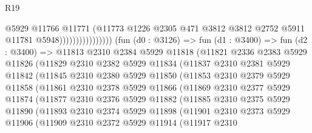 \begin{lexlean}{R19}
\begin{coremodule}
                                      @5929
                                      @11766
                                      @11771
                                      (@11773
                                        @1226
                                        @2305
                                        @471
                                        @3812
                                        @3812
                                        @2752
                                        @5911
                                        @11781
                                        @5948))))))))))))))))
        (fun (d0 : @3126) =>
        fun (d1 : @3400) =>
        fun (d2 : @3400) =>
        @11813
          @2310
          @2384
          @5929
          @11818
          (@11821
            @2336
            @2383
            @5929
            @11826
            (@11829
              @2310
              @2382
              @5929
              @11834
              (@11837
                @2310
                @2381
                @5929
                @11842
                (@11845
                  @2310
                  @2380
                  @5929
                  @11850
                  (@11853
                    @2310
                    @2379
                    @5929
                    @11858
                    (@11861
                      @2310
                      @2378
                      @5929
                      @11866
                      (@11869
                        @2310
                        @2377
                        @5929
                        @11874
                        (@11877
                          @2310
                          @2376
                          @5929
                          @11882
                          (@11885
                            @2310
                            @2375
                            @5929
                            @11890
                            (@11893
                              @2310
                              @2374
                              @5929
                              @11898
                              (@11901
                                @2310
                                @2373
                                @5929
                                @11906
                                (@11909
                                  @2310
                                  @2372
                                  @5929
                                  @11914
                                  (@11917
                                    @2310

\end{coremodule}
\end{lexlean}
